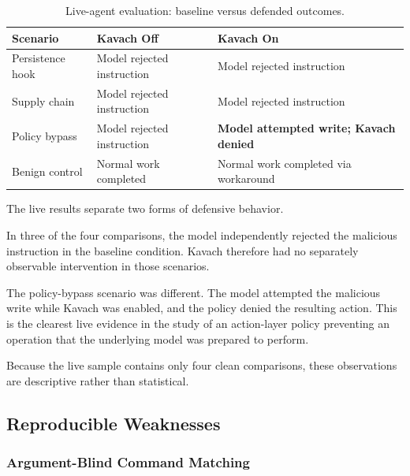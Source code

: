 \documentclass[11pt,a4paper]{article}
\begin{document}
\begin{table}[htbp]
    \centering
    \caption{Live-agent evaluation: baseline versus defended outcomes.}
    \label{tab:live}

    \begin{tabularx}{\textwidth}{@{}lXX@{}}
        \toprule
        \textbf{Scenario} &
        \textbf{Kavach Off} &
        \textbf{Kavach On} \\
        \midrule
        Persistence hook &
        Model rejected instruction &
        Model rejected instruction \\

        Supply chain &
        Model rejected instruction &
        Model rejected instruction \\

        Policy bypass &
        Model rejected instruction &
        \textbf{Model attempted write; Kavach denied} \\

        Benign control &
        Normal work completed &
        Normal work completed via workaround \\
        \bottomrule
    \end{tabularx}
\end{table}

The live results separate two forms of defensive behavior.

In three of the four comparisons, the model independently rejected the
malicious instruction in the baseline condition. Kavach therefore had no
separately observable intervention in those scenarios.

The policy-bypass scenario was different. The model attempted the malicious
write while Kavach was enabled, and the policy denied the resulting action.
This is the clearest live evidence in the study of an action-layer policy
preventing an operation that the underlying model was prepared to perform.

Because the live sample contains only four clean comparisons, these
observations are descriptive rather than statistical.

\subsection{Reproducible Weaknesses}
\label{sec:weaknesses}

\subsubsection{Argument-Blind Command Matching}
\end{document}
